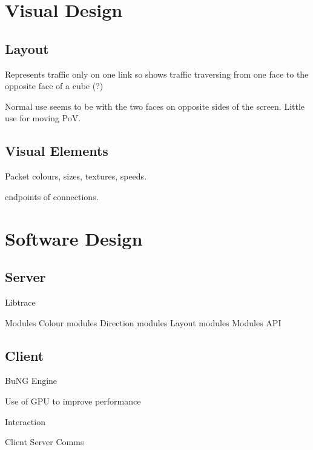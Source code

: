 
\section{Visual Design}
\label{visual}

\subsection{Layout}

Represents traffic only on one link so shows traffic traversing from one face to the opposite face of a cube (?)

Normal use seems to be with the two faces on opposite sides of the screen.  Little use for moving PoV.

\subsection{Visual Elements}

Packet colours, sizes, textures, speeds.

endpoints of connections.

\section{Software Design}
\label{software}

\subsection{Server}

Libtrace

Modules
	Colour modules
	Direction modules
	Layout modules
Modules API


\subsection{Client}

BuNG Engine

Use of GPU to improve performance

Interaction

Client Server Comms


